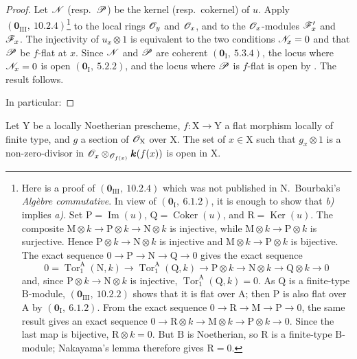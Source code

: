 \begin{proof}
Let $\mathscr{N}$ (resp.\ $\mathscr{P}$) be the kernel (resp.\ cokernel) of $u$.
Apply $(\mathbf{0}_{\mathrm{III}},~10.2.4)$\footnote{Here is a proof of
$(\mathbf{0}_{\mathrm{III}},~10.2.4)$ which was not published in
N.~Bourbaki's \emph{Alg\`ebre commutative}. In view of
$(\mathbf{0}_\mathrm{I},~6.1.2)$, it is enough to show that \emph{b)} implies \emph{a)}.
Set $\mathrm{P}=\operatorname{Im}(u)$,
$\mathrm{Q}=\operatorname{Coker}(u)$, and
$\mathrm{R}=\operatorname{Ker}(u)$. The composite
$\mathrm{M}\otimes k\to\mathrm{P}\otimes k\to\mathrm{N}\otimes k$ is
injective, while $\mathrm{M}\otimes k\to\mathrm{P}\otimes k$ is
surjective. Hence $\mathrm{P}\otimes k\to\mathrm{N}\otimes k$ is
injective and $\mathrm{M}\otimes k\to\mathrm{P}\otimes k$ is bijective.
The exact sequence $0\to\mathrm{P}\to\mathrm{N}\to\mathrm{Q}\to0$ gives
the exact sequence
\[
0=\operatorname{Tor}_1^\mathrm{A}(\mathrm{N},k)\to\operatorname{Tor}_1^\mathrm{A}(\mathrm{Q},k)\to\mathrm{P}\otimes k\to\mathrm{N}\otimes k\to\mathrm{Q}\otimes k\to 0
\]
and, since $\mathrm{P}\otimes k\to\mathrm{N}\otimes k$ is injective,
$\operatorname{Tor}_1^\mathrm{A}(\mathrm{Q},k)=0$. As $\mathrm{Q}$ is a
finite-type $\mathrm{B}$-module,
$(\mathbf{0}_{\mathrm{III}},~10.2.2)$ shows that it is flat over
$\mathrm{A}$; then $\mathrm{P}$ is also flat over $\mathrm{A}$ by
$(\mathbf{0}_\mathrm{I},~6.1.2)$. From the exact sequence
$0\to\mathrm{R}\to\mathrm{M}\to\mathrm{P}\to0$, the same result gives an
exact sequence
$0\to\mathrm{R}\otimes k\to\mathrm{M}\otimes k\to
\mathrm{P}\otimes k\to0$. Since the last map is bijective,
$\mathrm{R}\otimes k=0$. But $\mathrm{B}$ is Noetherian, so
$\mathrm{R}$ is a finite-type $\mathrm{B}$-module; Nakayama's lemma
therefore gives $\mathrm{R}=0$.}
to the local rings $\mathscr{O}_y$ and $\mathscr{O}_x$, and to the
$\mathscr{O}_x$-modules $\mathscr{F}'_x$ and $\mathscr{F}_x$. The injectivity of
$u_x\otimes1$ is equivalent to the two conditions
$\mathscr{N}_x=0$ and that $\mathscr{P}$ be $f$-flat at $x$. Since
$\mathscr{N}$ and $\mathscr{P}$ are coherent $(\mathbf{0}_\mathrm{I},~5.3.4)$,
the locus where $\mathscr{N}_x=0$ is open
$(\mathbf{0}_\mathrm{I},~5.2.2)$, and the locus where $\mathscr{P}$ is
$f$-flat is open by . The result follows.

In particular:
\end{proof}

\begin{corollary}[11.1.3]
\label{IV.11.1.3}
Let $\mathrm{Y}$ be a locally Noetherian prescheme,
$f:\mathrm{X}\to\mathrm{Y}$ a flat morphism locally of finite type, and
$g$ a section of $\mathscr{O}_\mathrm{X}$ over $\mathrm{X}$. The set of
$x\in\mathrm{X}$ such that $g_x\otimes 1$ is a non-zero-divisor in
$\mathscr{O}_x\otimes_{\mathscr{O}_{f(x)}}\boldsymbol{k}(f(x))$ is open in
$\mathrm{X}$.
\end{corollary}

